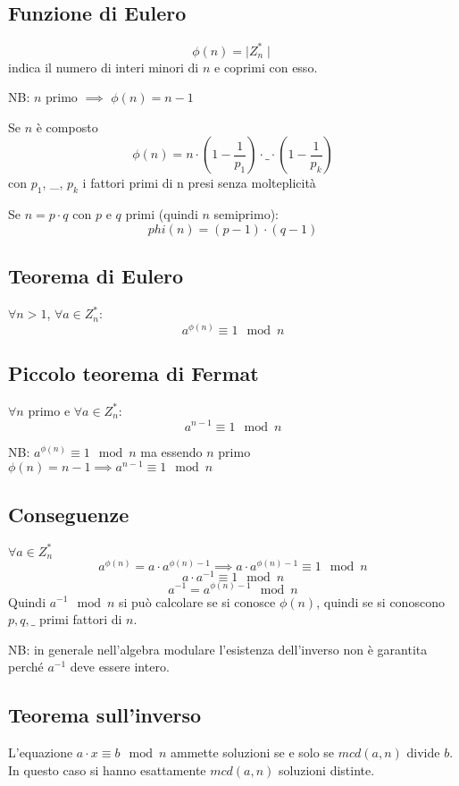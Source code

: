 \subsection{Funzione di Eulero}
$$ \phi(n) = \mid Z_{n}^{*} \mid $$
indica il numero di interi minori di $n$ e coprimi con esso.

NB: $n$ primo $\implies$ $\phi(n) = n-1$

Se $n$ è composto
$$ \phi(n) = n \cdot (1 - \frac{1}{p_1}) \cdot \_ \cdot (1 - \frac{1}{p_k})$$
con $p_1$, \_, $p_k$ i fattori primi di n presi senza molteplicità

Se $n = p \cdot q$ con $p$ e $q$ primi (quindi $n$ semiprimo):
$$ phi(n) = (p-1) \cdot (q-1) $$

\subsection{Teorema di Eulero}
$\forall n>1$, $\forall a \in Z_{n}^*$:
$$ a^{\phi(n)} \equiv 1 \mod n $$

\subsection{Piccolo teorema di Fermat}
$\forall n$ primo e $\forall a \in Z_{n}^*$:
$$ a^{n-1} \equiv 1 \mod n $$

NB: $ a^{\phi(n)} \equiv 1 \mod n $ ma essendo $n$ primo $\phi(n) = n-1 \implies  a^{n-1} \equiv 1 \mod n $

\subsection{Conseguenze}
$\forall a \in Z_{n}^*$
$$ a^{\phi(n)} = a \cdot a^{\phi(n)-1} \implies a \cdot a^{\phi(n)-1} \equiv 1 \mod n $$
$$ a \cdot a^{-1} \equiv 1 \mod n $$
$$ a^{-1} = a^{\phi(n)-1} \mod n $$
Quindi $a^{-1} \mod n$ si può calcolare se si conosce $\phi(n)$, quindi se si conoscono $p, q, \_$ primi fattori di $n$.

NB: in generale nell'algebra modulare l'esistenza dell'inverso non è garantita perché $a^{-1}$ deve essere intero.

\subsection{Teorema sull'inverso}
L'equazione $a \cdot x \equiv b \mod n$ ammette soluzioni se e solo se $mcd(a,n)$ divide $b$.
In questo caso si hanno esattamente $mcd(a,n)$ soluzioni distinte.

